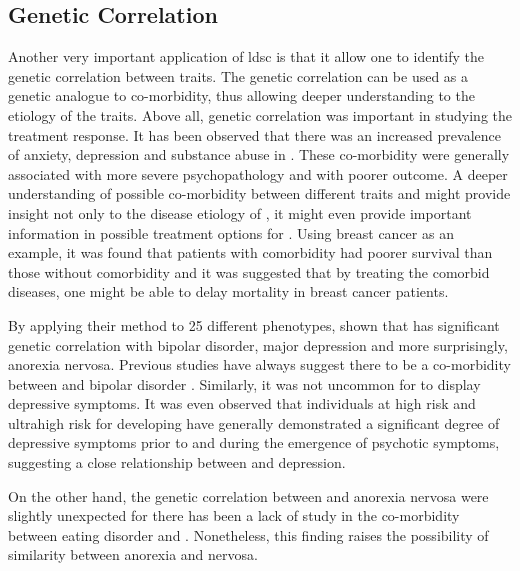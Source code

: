 	\subsection{Genetic Correlation}
	Another very important application of \gls{ldsc} is that it allow one to identify the genetic correlation between traits\citep{Bulik-Sullivan2015a}. 
	The genetic correlation can be used as a genetic analogue to co-morbidity, thus allowing deeper understanding to the etiology of the traits.
	Above all, genetic correlation was important in studying the treatment response. 
	It has been observed that there was an increased prevalence of anxiety, depression and substance abuse in \citep{Buckley2009}. 
	These co-morbidity were generally associated with more severe psychopathology and with poorer outcome\citep{Buckley2009}.
	A deeper understanding of possible co-morbidity between different traits and  might provide insight not only to the disease etiology of , it might even provide important information in possible treatment options for . 
	Using breast cancer as an example, it was found that patients with comorbidity had poorer survival than those without comorbidity\citep{Sogaard2013} and it was suggested that by treating the comorbid diseases, one might be able to delay mortality in breast cancer patients\citep{Ording2013}.
		
	By applying their method to 25 different phenotypes, \citet{Bulik-Sullivan2015a} shown that  has significant genetic correlation with bipolar disorder, major depression and more surprisingly, anorexia nervosa.
	Previous studies have always suggest there to be a co-morbidity between  and bipolar disorder \citep{Lichtenstein2009,Purcell2009,Buckley2009}.
	Similarly, it was not uncommon for  to display depressive symptoms\citep{Buckley2009}. 
	It was even observed that individuals at high risk and ultrahigh risk for developing  have generally demonstrated a significant degree of depressive symptoms prior to and during the emergence of psychotic symptoms, suggesting a close relationship between  and depression. 
	
	On the other hand, the genetic correlation between  and anorexia nervosa were slightly unexpected for there has been a lack of study in the co-morbidity between eating disorder and . 
	Nonetheless, this finding raises the possibility of similarity between anorexia and nervosa.
